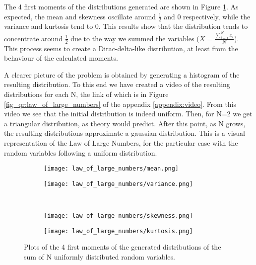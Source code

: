     The 4 first moments of the distributions generated are shown in Figure \ref{fig:law_of_large_numbers}. As expected, the mean and skewness oscillate around $\frac{1}{2}$ and 0 respectively, while the variance and kurtosis tend to 0. This results show that the distribution tends to concentrate around $\frac{1}{2}$ due to the way we summed the variables ($X = \frac{\sum_{i=1}^{N} x_i}{N}$). This process seems to create a Dirac-delta-like distribution, at least from the behaviour of the calculated moments.

    A clearer picture of the problem is obtained by generating a histogram of the resulting distribution. To this end we have created a video of the resulting distributions for each N, the link of which is in Figure \ref{fig_qr:law_of_large_numbers} of the appendix \ref{appendix:video}. From this video we see that the initial distribution is indeed uniform. Then, for N=2 we get a triangular distribution, as theory would predict. After this point, as N grows, the resulting distributions approximate a gaussian distribution. This is a visual representation of the Law of Large Numbers, for the particular case with the random variables following a uniform distribution.


    \begin{figure}[H]
        \centering
        \begin{subfigure}[t]{0.48\textwidth}
            \texttt{[image: law\_of\_large\_numbers/mean.png]}
            \caption{}
        \end{subfigure}
        \begin{subfigure}[t]{0.48\textwidth}
            \texttt{[image: law\_of\_large\_numbers/variance.png]}
            \caption{}
        \end{subfigure}
        \\
        \begin{subfigure}[t]{0.48\textwidth}
            \texttt{[image: law\_of\_large\_numbers/skewness.png]}
            \caption{}
        \end{subfigure}
        \begin{subfigure}[t]{0.48\textwidth}
            \texttt{[image: law\_of\_large\_numbers/kurtosis.png]}
            \caption{}
        \end{subfigure}
        \caption{Plots of the 4 first moments of the generated distributions of the sum of N uniformly distributed random variables.}
        \label{fig:law_of_large_numbers}
    \end{figure}

